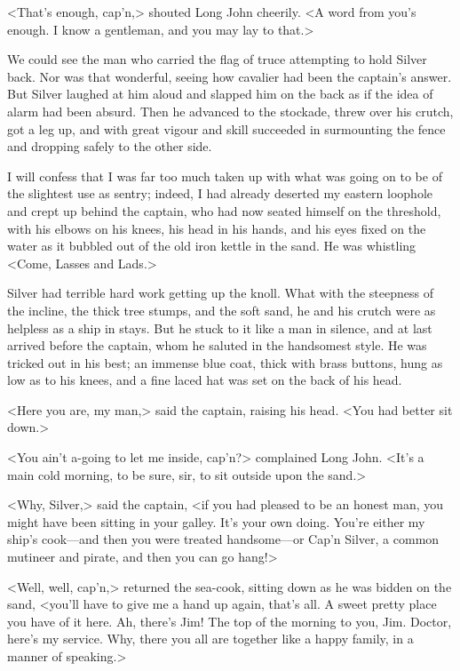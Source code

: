<That's enough, cap'n,> shouted Long John cheerily. <A word from you's enough. I know a gentleman, and you may lay to that.>

We could see the man who carried the flag of truce attempting to hold Silver back. Nor was that wonderful, seeing how cavalier had been the captain's answer. But Silver laughed at him aloud and slapped him on the back as if the idea of alarm had been absurd. Then he advanced to the stockade, threw over his crutch, got a leg up, and with great vigour and skill succeeded in surmounting the fence and dropping safely to the other side.

I will confess that I was far too much taken up with what was going on to be of the slightest use as sentry; indeed, I had already deserted my eastern loophole and crept up behind the captain, who had now seated himself on the threshold, with his elbows on his knees, his head in his hands, and his eyes fixed on the water as it bubbled out of the old iron kettle in the sand. He was whistling <Come, Lasses and Lads.>

Silver had terrible hard work getting up the knoll. What with the steepness of the incline, the thick tree stumps, and the soft sand, he and his crutch were as helpless as a ship in stays. But he stuck to it like a man in silence, and at last arrived before the captain, whom he saluted in the handsomest style. He was tricked out in his best; an immense blue coat, thick with brass buttons, hung as low as to his knees, and a fine laced hat was set on the back of his head.

<Here you are, my man,> said the captain, raising his head. <You had better sit down.>

<You ain't a-going to let me inside, cap'n?> complained Long John. <It's a main cold morning, to be sure, sir, to sit outside upon the sand.>

<Why, Silver,> said the captain, <if you had pleased to be an honest man, you might have been sitting in your galley. It's your own doing. You're either my ship's cook—and then you were treated handsome—or Cap'n Silver, a common mutineer and pirate, and then you can go hang!>

<Well, well, cap'n,> returned the sea-cook, sitting down as he was bidden on the sand, <you'll have to give me a hand up again, that's all. A sweet pretty place you have of it here. Ah, there's Jim! The top of the morning to you, Jim. Doctor, here's my service. Why, there you all are together like a happy family, in a manner of speaking.>

